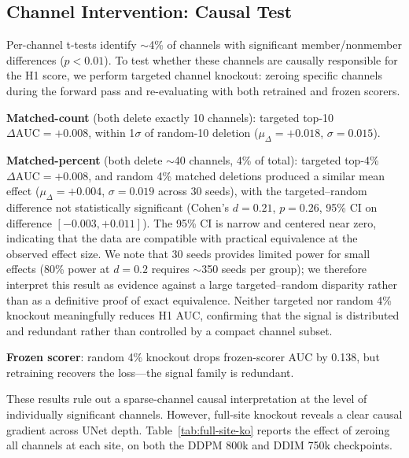 \documentclass[10pt,conference]{IEEEtran}
\begin{document}
\subsection{Channel Intervention: Causal Test}

Per-channel t-tests identify $\sim$4\% of channels with significant
member/nonmember differences ($p<0.01$). To test whether these channels
are causally responsible for the H1 score, we perform targeted channel
knockout: zeroing specific channels during the forward pass and
re-evaluating with both retrained and frozen scorers.

\textbf{Matched-count} (both delete exactly 10 channels): targeted top-10
$\Delta\text{AUC}{=}{+}0.008$, within 1$\sigma$ of random-10 deletion
($\mu_{\Delta}{=}{+}0.018$, $\sigma{=}0.015$).

\textbf{Matched-percent} (both delete $\sim$40 channels, 4\% of total):
targeted top-4\% $\Delta\text{AUC}{=}{+}0.008$, and random 4\% matched
deletions produced a similar mean effect
($\mu_{\Delta}{=}{+}0.004$, $\sigma{=}0.019$ across 30 seeds),
with the targeted--random difference not statistically significant
(Cohen's $d{=}0.21$, $p{=}0.26$, 95\% CI on difference
$[-0.003, +0.011]$). The 95\% CI is narrow and centered near zero,
indicating that the data are compatible with practical equivalence
at the observed effect size. We note that 30 seeds provides limited
power for small effects (80\% power at $d{=}0.2$ requires
$\sim$350 seeds per group); we therefore interpret this result as
evidence against a large targeted--random disparity rather than as
a definitive proof of exact equivalence. Neither targeted nor
random 4\% knockout meaningfully reduces H1 AUC, confirming that
the signal is distributed and redundant rather than controlled by
a compact channel subset.

\textbf{Frozen scorer}: random 4\% knockout drops frozen-scorer AUC by
0.138, but retraining recovers the loss---the signal family is redundant.

These results rule out a sparse-channel causal interpretation at the level
of individually significant channels. However, full-site knockout reveals
a clear causal gradient across UNet depth. Table~\ref{tab:full-site-ko}
reports the effect of zeroing all channels at each site, on both the DDPM
800k and DDIM 750k checkpoints.
\end{document}
